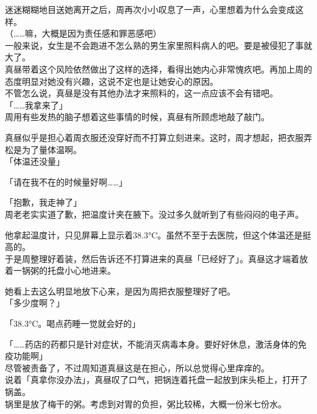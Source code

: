 迷迷糊糊地目送她离开之后，周再次小小叹息了一声，心里想着为什么会变成这样。\\

（……嘛，大概是因为责任感和罪恶感吧）\\

一般来说，女生是不会跑进不怎么熟的男生家里照料病人的吧。要是被侵犯了事就大了。\\

真昼带着这个风险依然做出了这样的选择，看得出她内心非常愧疚吧。再加上周的态度明显对她没有兴趣，这说不定也是让她安心的原因。\\

不管怎么说，真昼是没有其他办法才来照料的，这一点应该不会有错吧。\\

「……我拿来了」\\

周用有些发热的脑子想着这些事情的时候，真昼有所顾虑地敲了敲门。

真昼似乎是担心着周衣服还没穿好而不打算立刻进来。这时，周才想起，把衣服弄松是为了量体温啊。\\

「体温还没量」

「请在我不在的时候量好啊……」

「抱歉，我走神了」\\

周老老实实道了歉，把温度计夹在腋下。没过多久就听到了有些闷闷的电子声。

他拿起温度计，只见屏幕上显示着38.3°C。虽然不至于去医院，但这个体温还是挺高的。\\

于是周整理好着装，然后告诉还不打算进来的真昼「已经好了」。真昼这才端着放着一锅粥的托盘小心地进来。

她看上去这么明显地放下心来，是因为周把衣服整理好了吧。\\

「多少度啊？」

「38.3°C。喝点药睡一觉就会好的」

「……药店的药都只是针对症状，不能消灭病毒本身。要好好休息，激活身体的免疫功能啊」\\

尽管被责备了，不过周知道真昼这是在担心，所以总觉得心里痒痒的。\\

说着「真拿你没办法」，真昼叹了口气，把锅连着托盘一起放到床头柜上，打开了锅盖。\\

锅里是放了梅干的粥。考虑到对胃的负担，粥比较稀，大概一份米七份水。

